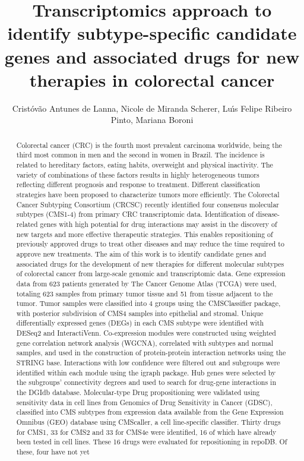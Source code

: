 \documentclass[twoside]{article}
\title{\vspace{-15mm}\fontsize{24pt}{10pt}\selectfont\textbf{ Transcriptomics approach to identify subtype-specific candidate genes and associated drugs for new therapies in colorectal cancer }} %
\author{ Crist\'ov\~ao Antunes de Lanna, Nicole de Miranda Scherer, Lu\'{\i}s Felipe Ribeiro Pinto, Mariana Boroni }
\affil{ Instituto Nacional de C\^ancer }
\date{}
\begin{document}
  
  
  \maketitle %
  
  
  \thispagestyle{fancy} %
  
  
  \begin{abstract}
  Colorectal cancer (CRC) is the fourth most prevalent carcinoma worldwide,  being the third most common in men and the second in women in Brazil. The incidence is related to hereditary factors,  eating habits,  overweight and physical inactivity. The variety of combinations of these factors results in highly heterogeneous tumors reflecting different  prognosis and response to treatment. Different classification strategies have been proposed to characterize tumors more efficiently. The Colorectal Cancer Subtyping Consortium (CRCSC) recently identified four consensus molecular subtypes (CMS1-4) from primary CRC transcriptomic data. Identification of disease-related genes with high potential for drug interactions may assist in the discovery of new targets and more effective therapeutic strategies. This enables repositioning of previously approved drugs to treat other diseases and may reduce the time required to approve new treatments. The aim of this work is to identify candidate genes and associated drugs for the development of new therapies for different molecular subtypes of colorectal cancer from large-scale genomic and transcriptomic data. Gene expression data from 623 patients generated by The Cancer Genome Atlas (TCGA) were used,  totaling 623 samples from primary tumor tissue and 51 from tissue adjacent to the tumor. Tumor samples were classified into 4 groups using the CMSClassifier package,  with posterior subdivision of CMS4 samples into epithelial and stromal. Unique differentially expressed genes (DEGs) in each CMS subtype were identified with DESeq2 and InteractiVenn. Co-expression modules were constructed using weighted gene correlation network analysis (WGCNA),  correlated with subtypes and normal samples,  and used in the construction of protein-protein interaction networks using the STRING base. Interactions with low confidence were filtered out and subgroups were identified within each module using the igraph package. Hub genes were selected by the subgroups’ connectivity degrees and used to search for drug-gene interactions in the DGIdb database. Molecular-type Drug propositioning were validated using sensitivity data in cell lines from Genomics of Drug Sensitivity in Cancer (GDSC),  classified into CMS subtypes from expression data available from the Gene Expression Omnibus (GEO) database using CMScaller,  a cell line-specific classifier. Thirty drugs for CMS1,  33 for CMS2 and 33 for CMS4e were identified,  16 of which have already been tested in cell lines. These 16 drugs were evaluated for repositioning in repoDB. Of these,  four have not yet 
\end{abstract}
\end{document}

